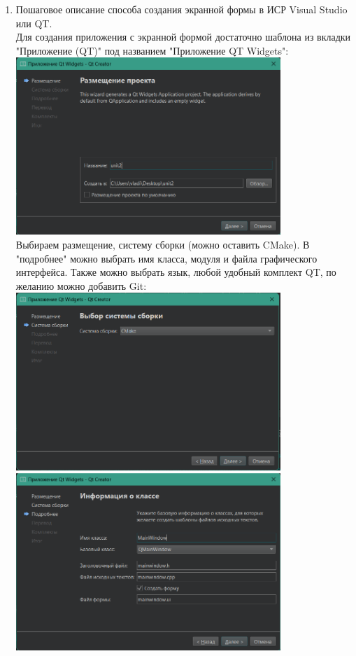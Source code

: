 \documentclass[a4paper,14pt]{extarticle}
\begin{document}
\begin{enumerate}[1.]
    \item Пошаговое описание способа создания экранной формы в ИСР Visual
    Studio или QT.\\
    Для создания приложения с экранной формой достаточно шаблона из вкладки "Приложение (QT)" под названием "Приложение QT Widgets":\\
    \includegraphics[width=100mm]{qtfS1}\\
    Выбираем размещение, систему сборки (можно оставить CMake). В "подробнее" можно выбрать имя класса, модуля и файла графического интерфейса. Также можно выбрать язык, любой удобный комплект QT, по желанию можно добавить Git:\\
    \includegraphics[width=100mm]{qtfS2}\\
    \includegraphics[width=100mm]{qtfS3}\\

\end{enumerate}
\end{document}
